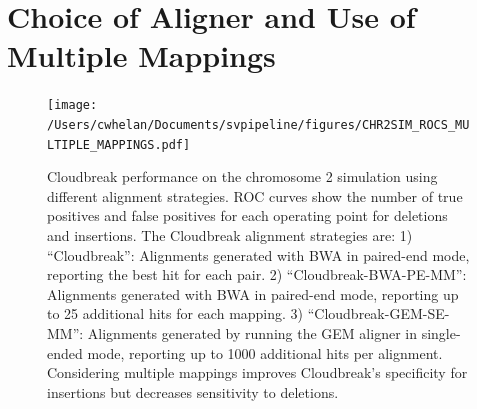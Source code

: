 \section{Choice of Aligner and Use of Multiple Mappings}\label{section_multiple_mappings_eval}

\begin{figure}
\centering
\texttt{[image: /Users/cwhelan/Documents/svpipeline/figures/CHR2SIM\_ROCS\_MULTIPLE\_MAPPINGS.pdf]}
\caption[Cloudbreak performance on the simulated data set using different alignment strategies.]{Cloudbreak performance on the chromosome 2 simulation using different alignment strategies. ROC curves show the number of true positives and false positives for each operating point for deletions and insertions. The Cloudbreak alignment strategies are: 1) ``Cloudbreak'': Alignments generated with BWA in paired-end mode, reporting the best hit for each pair. 2) ``Cloudbreak-BWA-PE-MM'': Alignments generated with BWA in paired-end mode, reporting up to 25 additional hits for each mapping. 3) ``Cloudbreak-GEM-SE-MM'': Alignments generated by running the GEM aligner in single-ended mode, reporting up to 1000 additional hits per alignment. Considering multiple mappings improves Cloudbreak's specificity for insertions but decreases sensitivity to deletions.}
\label{alignment_comparison}
\end{figure}

